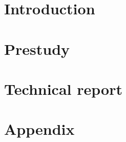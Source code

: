 




\hypersetup{linkcolor=black}
\setcounter{tocdepth}{1}
\tableofcontents

\part{Introduction}
%
%



\part{Prestudy}







\part{Technical report}

%





\part{Appendix}
\begin{appendices}

% 
% 

% 

\printglossaries

\end{appendices}


